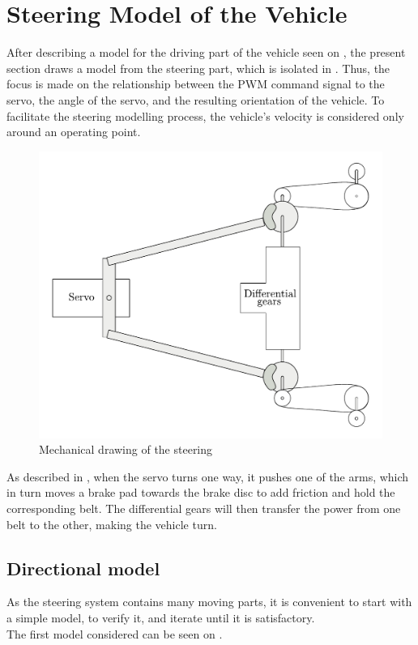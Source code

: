 \section{Steering Model of the Vehicle}\label{sec:SteeringModel}
After describing a model for the driving part of the vehicle seen on , the present section draws a model from the steering part, which is isolated in . Thus, the focus is made on the relationship between the PWM command signal to the servo, the angle of the servo, and the resulting orientation of the vehicle. To facilitate the steering modelling process, the vehicle's velocity is considered only around an operating point.

 \begin{figure}[H]
 	\centering
 	\includegraphics[scale=0.6]{figures/steeringMechanical.pdf}
 	\caption{Mechanical drawing of the steering}
 	\label{steeringMechanical}
 \end{figure}

As described in , when the servo turns one way, it pushes one of the arms, which in turn moves  a brake pad towards the brake disc to add friction and hold the corresponding belt. The differential gears will then transfer the power from one belt to the other, making the vehicle turn.


\subsection{Directional model}
As the steering system contains many moving parts, it is convenient to start with a simple model, to verify it, and iterate until it is satisfactory.\\
%
The first model considered can be seen on .

